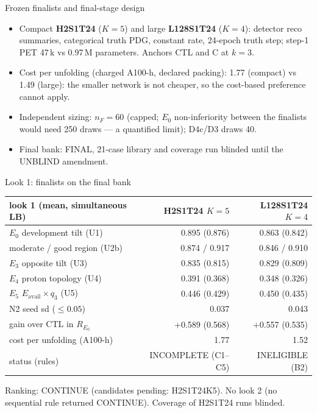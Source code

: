 \documentclass[aspectratio=169,10pt]{beamer}
\def\evidencetext{}
\begin{document}
\gdef\evidencetext{\texttt{resources/cost\_t24-20260927.json}; \texttt{sizing/sizing\_final-20260927.json}; \texttt{sizing/sizing\_library-20260927.json}; \texttt{PROTOCOL-20260925.md (3c--3f)}}
\begin{frame}{Frozen finalists and final-stage design}
\small\begin{itemize}\item Compact \textbf{H2S1T24} ($K{=}5$) and large \textbf{L128S1T24} ($K{=}4$): detector reco summaries, categorical truth PDG, constant rate, 24-epoch truth step; step-1 PET 47\,k vs 0.97\,M parameters. Anchors CTL and C at $k{=}3$.\item Cost per unfolding (charged A100-h, declared packing): 1.77 (compact) vs 1.49 (large): the smaller network is not cheaper, so the cost-based preference cannot apply.\item Independent sizing: $n_F = 60$ (capped; $E_0$ non-inferiority between the finalists would need 250 draws --- a quantified limit); D4c/D3 draws 40.\item Final bank: FINAL, 21-case library and coverage run blinded until the UNBLIND amendment.\end{itemize}
\end{frame}

\gdef\evidencetext{\texttt{results/final/decision\_look1.json}; \texttt{resources/cost\_fb\_look1-20260930.json}}
\begin{frame}{Look 1: finalists on the final bank}
{\scriptsize
\begin{tabular}{lrr}
\toprule
look 1 (mean, simultaneous LB) & H2S1T24 $K{=}5$ & L128S1T24 $K{=}4$ \\
\midrule
$E_0$ development tilt (U1) & 0.895 (0.876) & 0.863 (0.842) \\
moderate / good region (U2b) & 0.874 / 0.917 & 0.846 / 0.910 \\
$E_3$ opposite tilt (U3) & 0.835 (0.815) & 0.829 (0.809) \\
$E_4$ proton topology (U4) & 0.391 (0.368) & 0.348 (0.326) \\
$E_5$ $E_\mathrm{avail}\times q_3$ (U5) & 0.446 (0.429) & 0.450 (0.435) \\
N2 seed sd ($\le 0.05$) & 0.037 & 0.043 \\
gain over CTL in $R_{E_0}$ & +0.589 (0.568) & +0.557 (0.535) \\
cost per unfolding (A100-h) & 1.77 & 1.52 \\
status (rules) & INCOMPLETE (C1--C5) & INELIGIBLE (B2) \\
\bottomrule
\end{tabular}}\par\vspace{0.15cm}\small Ranking: CONTINUE (candidates pending: H2S1T24K5). No look 2 (no sequential rule returned CONTINUE). Coverage of H2S1T24 runs blinded.
\end{frame}
\end{document}
